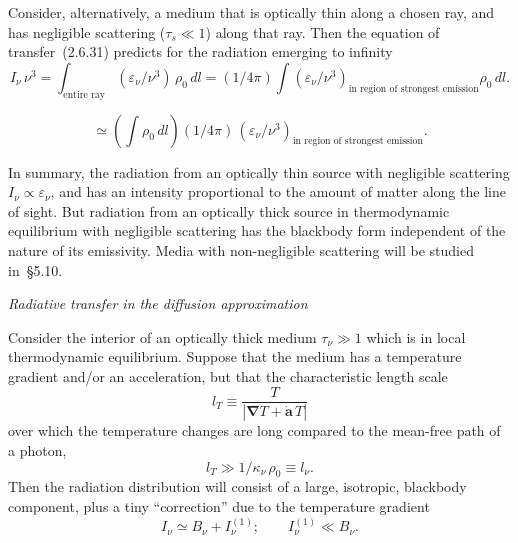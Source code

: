Consider, alternatively, a medium that is optically thin along a chosen ray,
and has negligible scattering ($\tau_s \ll 1$) along that ray.  Then the
equation of transfer~(2.6.31) predicts for the radiation emerging to infinity
%
\begin{equation}
\tag{2.6.37}
I_\nu\,\nu^3 = \int_{\text{entire ray}} (\varepsilon_\nu/\nu^3)\,\rho_0\,dl
= (1/4\pi)\int (\varepsilon_\nu/\nu^3)_{\text{in region of strongest emission}}
  \rho_0\,dl.
\end{equation}

\begin{equation}
\tag{2.6.38}
\simeq \left(\int \rho_0\,dl\right)\!(1/4\pi)\,
(\varepsilon_\nu/\nu^3)_{\text{in region of strongest emission}}.
\end{equation}

In summary, the radiation from an optically thin source with negligible
scattering $I_\nu \propto \varepsilon_\nu$, and has an intensity proportional
to the amount of matter along the line of sight.  But radiation from an
optically thick source in thermodynamic equilibrium with negligible scattering
has the blackbody form independent of the nature of its emissivity.  Media with
non-negligible scattering will be studied in~\S5.10.


\bigskip
\noindent
\emph{Radiative transfer in the diffusion approximation}

\medskip
\noindent
Consider the interior of an optically thick medium $\tau_\nu \gg 1$ which is
in local thermodynamic equilibrium.  Suppose that the medium has a temperature
gradient and/or an acceleration, but that the characteristic length scale
%
\begin{equation}
\tag{2.6.39}
l_T \equiv \frac{T}{|\boldsymbol{\nabla}T + \dot{\mathbf{a}}\,T|}
\end{equation}
%
over which the temperature changes are long compared to the mean-free path of a
photon,
%
\begin{equation}
\tag{2.6.40}
l_T \gg 1/\kappa_\nu\,\rho_0 \equiv l_\nu.
\end{equation}
%
Then the radiation distribution will consist of a large, isotropic, blackbody
component, plus a tiny ``correction'' due to the temperature gradient
%
\begin{equation}
\tag{2.6.41}
I_\nu \simeq B_\nu + I_\nu^{(1)};\qquad
I_\nu^{(1)} \ll B_\nu.
\end{equation}

